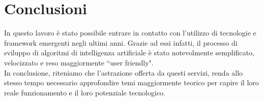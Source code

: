 \section{Conclusioni}
In questo lavoro è stato possibile entrare in contatto con l'utilizzo di tecnologie e framework emergenti negli ultimi anni.
Grazie ad essi infatti, il processo di sviluppo di algoritmi di intelligenza artificiale è stato notevolmente semplificato, velocizzato e reso maggiormente ``user friendly".
\\ In conclusione, riteniamo che l'astrazione offerta da questi servizi, renda allo stesso tempo necessario approfondire temi maggiormente teorico per capire il loro reale funzionamento e il loro potenziale tecnologico.
